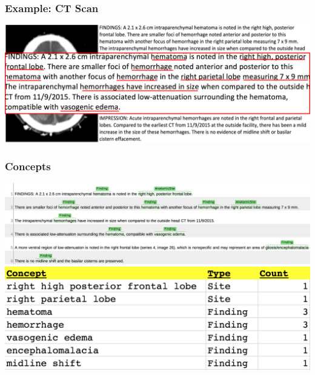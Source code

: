 \documentclass[10pt]{beamer}
\begin{document}
\begin{frame}
\frametitle{Example: CT Scan}

\begin{center}
	\includegraphics[scale=0.2]{figures/ct-scan-image-and-note-blowup.png}
\end{center}


\end{frame}

\begin{frame}
\frametitle{Concepts}

\begin{center}
	\includegraphics[scale=0.3]{figures/ct-scan-concepts.png}
	\\ \vspace{1em}
	\includegraphics[scale=0.3]{figures/ct-scan-concepts-structured.png}
\end{center}

\end{frame}
\end{document}
